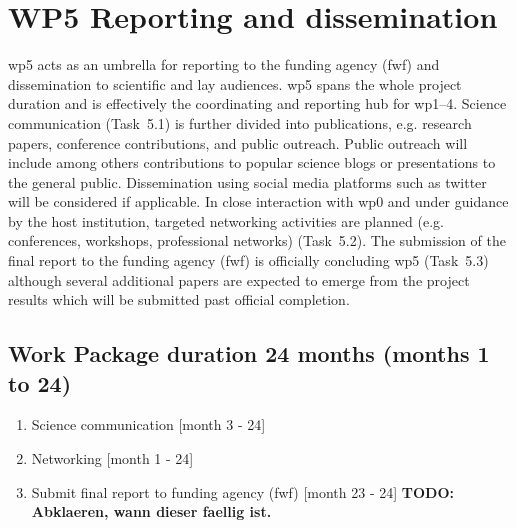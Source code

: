 \section{WP5 Reporting and dissemination}
\label{sec:wp5}
\gls{wp}5 acts as an umbrella for reporting to the funding agency (\gls{fwf}) and dissemination to scientific and lay audiences. \gls{wp}5 spans the whole project duration and is effectively the coordinating and reporting hub for \gls{wp}1--4. Science communication (Task~5.1) is further divided into publications, e.g. research papers, conference contributions, and public outreach. Public outreach will include among others contributions to popular science blogs or presentations to the general public. Dissemination using social media platforms such as twitter will be considered if applicable. In close interaction with \gls{wp}0 and under guidance by the host institution, targeted networking activities are planned (e.g. conferences, workshops, professional networks) (Task~5.2). The submission of the final report to the funding agency (\gls{fwf}) is officially concluding \gls{wp}5 (Task~5.3) although several additional papers are expected to emerge from the project results which will be submitted past official completion.

\subsection*{Work Package duration 24 months (months 1 to 24)}
\begin{enumerate}[start=1,label={T5.\arabic*}]
  \itemsep0pt
\item Science communication \hfill [month 3 - 24]
\item Networking \hfill [month 1 - 24]
\item Submit final report  to funding agency (\gls{fwf}) \hfill [month 23 - 24] \textbf{\color{red}TODO: Abklaeren, wann dieser faellig ist.}
\end{enumerate}
